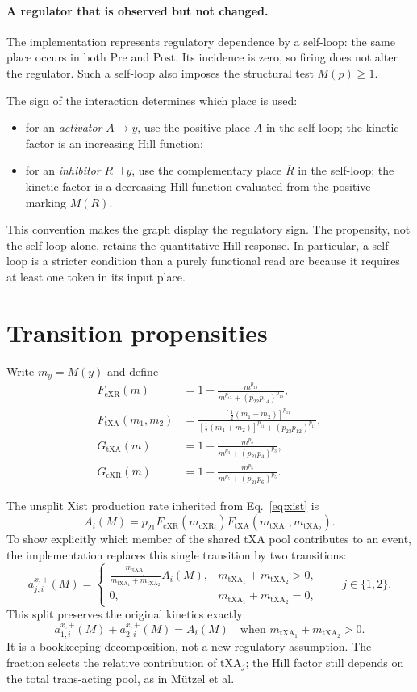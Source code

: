 \documentclass[11pt,a4paper]{article}
\newcommand{\txa}{\mathrm{tXA}}
\newcommand{\cxr}{\mathrm{cXR}}
\newcommand{\Pre}{\mathrm{Pre}}
\newcommand{\Post}{\mathrm{Post}}
\begin{document}
\paragraph{A regulator that is observed but not changed.}
The implementation represents regulatory dependence by a self-loop: the same
place occurs in both $\Pre$ and $\Post$.  Its incidence is zero, so firing does
not alter the regulator.  Such a self-loop also imposes the structural test
$M(p)\geq1$.

The sign of the interaction determines which place is used:
\begin{itemize}
  \item for an \emph{activator} $A\rightarrow y$, use the positive place $A$
        in the self-loop; the kinetic factor is an increasing Hill function;
  \item for an \emph{inhibitor} $R\dashv y$, use the complementary place
        $\overline R$ in the self-loop; the kinetic factor is a decreasing Hill
        function evaluated from the positive marking $M(R)$.
\end{itemize}
This convention makes the graph display the regulatory sign.  The propensity,
not the self-loop alone, retains the quantitative Hill response.  In
particular, a self-loop is a stricter condition than a purely functional read
arc because it requires at least one token in its input place.

\section{Transition propensities}

Write $m_y=M(y)$ and define
\begin{align*}
 F_{\cxr}(m)&=1-\frac{m^{p_{13}}}
  {m^{p_{13}}+(p_{22}p_{14})^{p_{13}}},\\
 F_{\txa}(m_1,m_2)&=
 \frac{[\tfrac12(m_1+m_2)]^{p_{11}}}
 {[\tfrac12(m_1+m_2)]^{p_{11}}+(p_{23}p_{12})^{p_{11}}},\\
 G_{\txa}(m)&=1-\frac{m^{p_3}}
  {m^{p_3}+(p_{21}p_4)^{p_3}},\\
 G_{\cxr}(m)&=1-\frac{m^{p_5}}
  {m^{p_5}+(p_{21}p_6)^{p_5}}.
\end{align*}

The unsplit Xist production rate inherited from Eq.~\eqref{eq:xist} is
\[
 A_i(M)=p_{21}F_{\cxr}(m_{\cxr_i})
                 F_{\txa}(m_{\txa_1},m_{\txa_2}).
\]
To show explicitly which member of the shared tXA pool contributes to an
event, the implementation replaces this single transition by two transitions:
\[
 a_{j,i}^{x,+}(M)=
 \begin{cases}
 \displaystyle
 \frac{m_{\txa_j}}{m_{\txa_1}+m_{\txa_2}}A_i(M),
 &m_{\txa_1}+m_{\txa_2}>0,\\[6pt]
 0,&m_{\txa_1}+m_{\txa_2}=0,
 \end{cases}
 \qquad j\in\{1,2\}.
\]
This split preserves the original kinetics exactly:
\[
 a_{1,i}^{x,+}(M)+a_{2,i}^{x,+}(M)=A_i(M)
 \quad\text{when }m_{\txa_1}+m_{\txa_2}>0.
\]
It is a bookkeeping decomposition, not a new regulatory assumption.  The
fraction selects the relative contribution of $\txa_j$; the Hill factor still
depends on the total trans-acting pool, as in M\"utzel et al.
\end{document}
